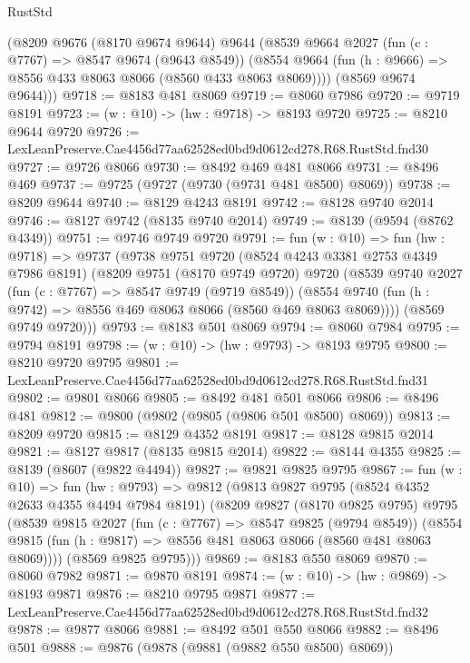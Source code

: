 \begin{lexlean}{RustStd}
\begin{coremodule}
      (@8209
        @9676
        (@8170 @9674 @9644)
        @9644
        (@8539
          @9664
          @2027
          (fun (c : @7767) => @8547 @9674 (@9643 @8549))
          (@8554 @9664 (fun (h : @9666) => @8556 @433 @8063 @8066 (@8560 @433 @8063 @8069))))
        (@8569 @9674 @9644)))
@9718 := @8183 @481 @8069
@9719 := @8060 @7986
@9720 := @9719 @8191
@9723 := (w : @10) -> (hw : @9718) -> @8193 @9720
@9725 := @8210 @9644 @9720
@9726 := LexLeanPreserve.Cae4456d77aa62528ed0bd9d0612cd278.R68.RustStd.fnd30
@9727 := @9726 @8066
@9730 := @8492 @469 @481 @8066
@9731 := @8496 @469
@9737 := @9725 (@9727 (@9730 (@9731 @481 @8500) @8069))
@9738 := @8209 @9644
@9740 := @8129 @4243 @8191
@9742 := @8128 @9740 @2014
@9746 := @8127 @9742 (@8135 @9740 @2014)
@9749 := @8139 (@9594 (@8762 @4349))
@9751 := @9746 @9749 @9720
@9791 := fun (w : @10) =>
  fun (hw : @9718) =>
  @9737
    (@9738
      @9751
      @9720
      (@8524 @4243 @3381 @2753 @4349 @7986 @8191)
      (@8209
        @9751
        (@8170 @9749 @9720)
        @9720
        (@8539
          @9740
          @2027
          (fun (c : @7767) => @8547 @9749 (@9719 @8549))
          (@8554 @9740 (fun (h : @9742) => @8556 @469 @8063 @8066 (@8560 @469 @8063 @8069))))
        (@8569 @9749 @9720)))
@9793 := @8183 @501 @8069
@9794 := @8060 @7984
@9795 := @9794 @8191
@9798 := (w : @10) -> (hw : @9793) -> @8193 @9795
@9800 := @8210 @9720 @9795
@9801 := LexLeanPreserve.Cae4456d77aa62528ed0bd9d0612cd278.R68.RustStd.fnd31
@9802 := @9801 @8066
@9805 := @8492 @481 @501 @8066
@9806 := @8496 @481
@9812 := @9800 (@9802 (@9805 (@9806 @501 @8500) @8069))
@9813 := @8209 @9720
@9815 := @8129 @4352 @8191
@9817 := @8128 @9815 @2014
@9821 := @8127 @9817 (@8135 @9815 @2014)
@9822 := @8144 @4355
@9825 := @8139 (@8607 (@9822 @4494))
@9827 := @9821 @9825 @9795
@9867 := fun (w : @10) =>
  fun (hw : @9793) =>
  @9812
    (@9813
      @9827
      @9795
      (@8524 @4352 @2633 @4355 @4494 @7984 @8191)
      (@8209
        @9827
        (@8170 @9825 @9795)
        @9795
        (@8539
          @9815
          @2027
          (fun (c : @7767) => @8547 @9825 (@9794 @8549))
          (@8554 @9815 (fun (h : @9817) => @8556 @481 @8063 @8066 (@8560 @481 @8063 @8069))))
        (@8569 @9825 @9795)))
@9869 := @8183 @550 @8069
@9870 := @8060 @7982
@9871 := @9870 @8191
@9874 := (w : @10) -> (hw : @9869) -> @8193 @9871
@9876 := @8210 @9795 @9871
@9877 := LexLeanPreserve.Cae4456d77aa62528ed0bd9d0612cd278.R68.RustStd.fnd32
@9878 := @9877 @8066
@9881 := @8492 @501 @550 @8066
@9882 := @8496 @501
@9888 := @9876 (@9878 (@9881 (@9882 @550 @8500) @8069))

\end{coremodule}
\end{lexlean}
